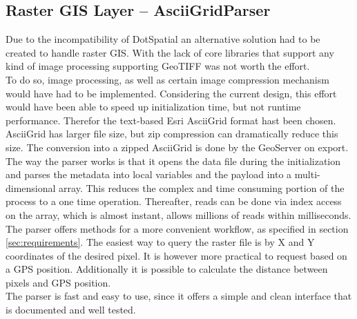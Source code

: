 \subsection{Raster GIS Layer -- AsciiGridParser}
\label{sec:parser}
Due to the incompatibility of DotSpatial an alternative solution had to be created to handle raster GIS. With the lack of core libraries that support any kind of image processing supporting GeoTIFF was not worth the effort.\\
To do so, image processing, as well as certain image compression mechanism would have had to be implemented. Considering the current design, this effort would have been able to speed up initialization time, but not runtime performance. Therefor the text-based Esri AsciiGrid format hast been chosen.\\
AsciiGrid has larger file size, but zip compression can dramatically reduce this size. The conversion into a zipped AsciiGrid is done by the GeoServer on export.\\
The way the parser works is that it opens the data file during the initialization and parses the metadata into local variables and the payload into a multi-dimensional array. This reduces the complex and time consuming portion of the process to a one time operation. Thereafter, reads can be done via index access on the array, which is almost instant, allows millions of reads within milliseconds.\\
The parser offers methods for a more convenient workflow, as specified in section \ref{sec:requirements}. The easiest way to query the raster file is by X and Y coordinates of the desired pixel. It is however more practical to request based on a GPS position. Additionally it is possible to calculate the distance between pixels and GPS position.\\
The parser is fast and easy to use, since it offers a simple and clean interface that is documented and well tested.